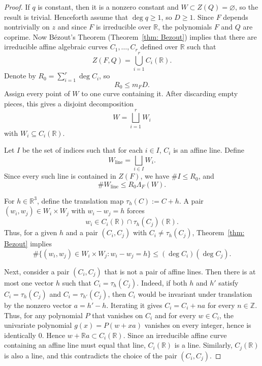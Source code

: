 \documentclass{amsart}%
\numberwithin{equation}{section}
\newcommand{\ZR}{\mathbb{R}}
\newcommand{\R}{\mathbb{R}}
\newcommand{\1}{\mathbbm{1}}
\begin{document}
\begin{proof}
If $q$ is constant, then it is a nonzero constant and $W\subset Z(Q)=\varnothing$, so the result is trivial.
Henceforth assume that $\deg q\ge1$, so $D\geq 1$.
Since $F$ depends nontrivially on $z$ and since $F$ is irreducible over $\R$, the polynomials $F$ and $Q$ are coprime.
Now B\'ezout's Theorem (Theorem~\ref{thm: Bezout}) implies that there are irreducible affine algebraic curves $C_1,\dots,C_r$ defined over $\R$ such that
\[
    Z(F,Q)=\bigcup_{i=1}^rC_i(\R).
\]
Denote by $R_0 = \sum_{i=1}^r\deg C_i$, so 
\[
    R_0\leq m_FD.
\]
Assign every point of $W$ to one curve containing it.  
After discarding empty pieces, this gives a disjoint decomposition
\[
    W=\bigsqcup_{i=1}^r W_i
\]
with $W_i\subseteq C_i(\R)$. 

\smallskip

Let $I$ be the set of indices such that for each $i\in I$, $C_i$ is an affine line. 
Define
\[
    W_{\mathrm{line}}=\bigsqcup_{i\in I}W_i.
\]
Since every such line is contained in $Z(F)$, we have $\#I\leq R_0$, and
\begin{equation}
\label{eq: wall line points}
    \#W_{\mathrm{line}}\leq R_0\Lambda_{ F}(W).
\end{equation}


\smallskip

For $h\in\R^3$, define the translation map $\tau_h(C):=C+h$.  
A pair $(w_i,w_j)\in W_i\times W_j$ with $w_i-w_j=h$ forces
\[
    w_i\in C_i(\R)\cap\tau_h(C_j)(\R).
\]
Thus, for a given $h$ and a pair $(C_i, C_j)$ with $C_i\neq\tau_h(C_j)$, Theorem~\ref{thm: Bezout} implies
\begin{equation}
\label{not-translation}
    \#\{(w_i, w_j)\in W_i\times W_j: w_i-w_j=h \}\leq (\deg C_i)(\deg C_j).
\end{equation} 

Next, consider a pair $(C_i,C_j)$ that is not a pair of affine lines. 
Then there is at most one vector $h$ such that $C_i=\tau_h(C_j)$. 
Indeed, if both $h$ and $h'$ satisfy $C_i=\tau_h(C_j)$ and $C_i=\tau_{h'}(C_j)$, then $C_i$ would be invariant under translation by the nonzero vector $a=h'-h$.
Iterating it gives $C_i = C_i + na$ for every $n\in\mathbb Z$. 
Thus, for any polynomial $P$ that vanishes on $C_i$ and for every $w\in C_i$, the univariate polynomial $g(x)=P(w+xa)$ vanishes on every integer, hence is identically $0$.
Hence $w+\R a\subset C_i(\R)$.
Since an irreducible affine curve containing an affine line must equal that line, $C_i(\ZR)$ is a line.
Similarly, $C_j(\ZR)$ is also a line, and this contradicts the choice of the pair $(C_i, C_j)$. 



\end{proof}
\end{document}

